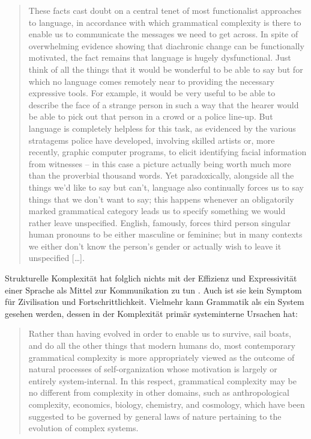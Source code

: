 \begin{quote}
These facts cast doubt on a central tenet of most functionalist approaches to language, in accordance with which grammatical complexity is there to enable us to communicate the messages we need to get across. In spite of overwhelming evidence showing that diachronic change can be functionally motivated, the fact remains that language is hugely dysfunctional. Just think of all the things that it would be wonderful to be able to say but for which no language comes remotely near to providing the necessary expressive tools. For example, it would be very useful to be able to describe the face of a strange person in such a way that the hearer would be able to pick out that person in a crowd or a police line-up. But language is completely helpless for this task, as evidenced by the various stratagems police have developed, involving skilled artists or, more recently, graphic computer programs, to elicit identifying facial information from witnesses – in this case a picture actually being worth much more than the proverbial thousand words. Yet paradoxically, alongside all the things we’d like to say but can’t, language also continually forces us to say things that we don’t want to say; this happens whenever an obligatorily marked grammatical category leads us to specify something we would rather leave unspecified. English, famously, forces third person singular human pronouns to be either masculine or feminine; but in many contexts we either don’t know the person’s gender or actually wish to leave it unspecified […]. \citep[32]{Gil2009}
\end{quote}

\noindent
Strukturelle Komplexität hat folglich nichts mit der Effizienz und Expressivität einer Sprache als Mittel zur Kommunikation zu tun \citep[2]{Miestamo2006}. Auch ist sie kein Symptom für Zivilisation und Fortschrittlichkeit. Vielmehr kann Grammatik als ein System gesehen werden, dessen  in der Komplexität primär systeminterne Ursachen hat:

\begin{quote}
Rather than having evolved in order to enable us to survive, sail boats, and do all the other things that modern humans do, most contemporary grammatical complexity is more appropriately viewed as the outcome of natural processes of self-organization whose motivation is largely or entirely system-internal. In this respect, grammatical complexity may be no different from complexity in other domains, such as anthropological complexity, economics, biology, chemistry, and cosmology, which have been suggested to be governed by general laws of nature pertaining to the evolution of complex systems. \citep[32--33]{Gil2009}
\end{quote}

